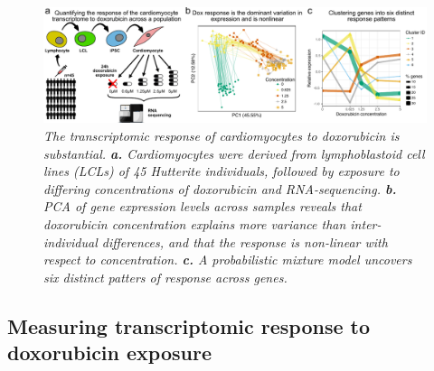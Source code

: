 \documentclass{article}
\begin{document}
\begin{figure}
\begin{center}
    \includegraphics[width=1\textwidth]{../figures/fig1.pdf} 
        \caption{\it{The transcriptomic response of cardiomyocytes to doxorubicin is substantial. \textbf{a.} Cardiomyocytes were derived from lymphoblastoid cell lines (LCLs) of 45 Hutterite individuals, followed by exposure to differing concentrations of doxorubicin and RNA-sequencing. \textbf{b.} PCA of gene expression levels across samples reveals that doxorubicin concentration explains more variance than inter-individual differences, and that the response is non-linear with respect to concentration. \textbf{c.} A probabilistic mixture model uncovers six distinct patters of response across genes.}}
    \label{fig1}
    \end{center}
\end{figure}

\subsection*{Measuring transcriptomic response to doxorubicin exposure}
\end{document}
